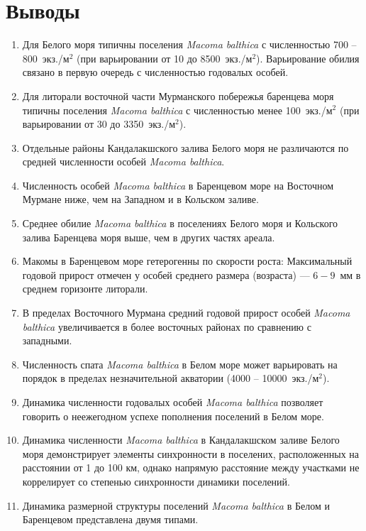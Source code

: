 		\section{Выводы}

	\begin{enumerate}
		\item Для Белого моря типичны поселения {\it Macoma balthica} с численностью  700 -- 800~экз./м$^2$ (при варьировании от 10 до 8500~экз./м$^2$). Варьирование обилия связано в первую очередь с численностью годовалых особей.
		\item Для литорали восточной части Мурманского побережья баренцева моря типичны поселения {\it Macoma balthica} с численностью  менее 100~экз./м$^2$ (при варьировании от 30 до 3350~экз./м$^2$).
		\item Отдельные районы Кандалакшского залива Белого моря не различаются по средней численности особей {\it Macoma balthica}.
		\item Численность особей {\it Macoma balthica} в Баренцевом море на Восточном Мурмане ниже, чем на Западном и в Кольском заливе.
		\item Среднее обилие {\it Macoma balthica} в поселениях Белого моря и Кольского залива Баренцева моря выше, чем в других частях ареала. 
		\item Макомы в Баренцевом море гетерогенны по скорости роста: Максимальный годовой прирост отмечен у особей среднего размера (возраста) --- $6 - 9$~мм в среднем горизонте литорали.
		\item В пределах Восточного Мурмана средний годовой прирост особей {\it Macoma balthica} увеличивается в более восточных районах по сравнению с западными.
		\item Численность спата {\it Macoma balthica} в Белом море может варьировать на порядок в пределах незначительной акватории (4000 -- 10000~экз./м$^2$).
		\item Динамика численности годовалых особей {\it Macoma balthica} позволяет говорить о неежегодном успехе пополнения поселений в Белом море.
		\item Динамика численности {\it Macoma balthica} в Кандалакшском заливе Белого моря демонстрирует элементы синхронности в поселених, расположенных на расстоянии от 1 до 100 км, однако напрямую расстояние между участками не коррелирует со степенью синхронности динамики поселений.
		\item Динамика размерной структуры поселений {\it Macoma balthica} в Белом и Баренцевом представлена двумя типами. \\

\end{enumerate}
